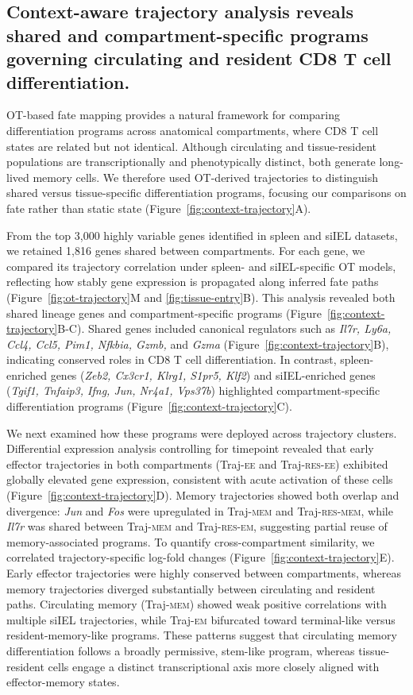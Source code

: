 \subsection{Context-aware trajectory analysis reveals shared and compartment-specific programs governing circulating and resident CD8 T cell differentiation. }

OT-based fate mapping provides a natural framework for comparing differentiation programs across anatomical compartments, where CD8 T cell states are related but not identical. Although circulating and tissue-resident populations are transcriptionally and phenotypically distinct, both generate long-lived memory cells. We therefore used OT-derived trajectories to distinguish shared versus tissue-specific differentiation programs, focusing our comparisons on fate rather than static state (Figure~\ref{fig:context-trajectory}A).

From the top 3,000 highly variable genes identified in spleen and siIEL datasets, we retained 1,816 genes shared between compartments. For each gene, we compared its trajectory correlation under spleen- and siIEL-specific OT models, reflecting how stably gene expression is propagated along inferred fate paths (Figure~\ref{fig:ot-trajectory}M and \ref{fig:tissue-entry}B). This analysis revealed both shared lineage genes and compartment-specific programs (Figure~\ref{fig:context-trajectory}B-C). Shared genes included canonical regulators such as \emph{Il7r, Ly6a, Ccl4, Ccl5, Pim1, Nfkbia, Gzmb,} and \emph{Gzma} (Figure~\ref{fig:context-trajectory}B), indicating conserved roles in CD8 T cell differentiation. In contrast, spleen-enriched genes (\emph{Zeb2, Cx3cr1, Klrg1, S1pr5, Klf2}) and siIEL-enriched genes (\emph{Tgif1, Tnfaip3, Ifng, Jun, Nr4a1, Vps37b}) highlighted compartment-specific differentiation programs (Figure~\ref{fig:context-trajectory}C).

We next examined how these programs were deployed across trajectory clusters. Differential expression analysis controlling for timepoint revealed that early effector trajectories in both compartments (Traj-\textsc{ee} and Traj-\textsc{res-ee}) exhibited globally elevated gene expression, consistent with acute activation of these cells (Figure~\ref{fig:context-trajectory}D). Memory trajectories showed both overlap and divergence: \emph{Jun} and \emph{Fos} were upregulated in Traj-\textsc{mem} and Traj-\textsc{res-mem}, while \emph{Il7r} was shared between Traj-\textsc{mem} and Traj-\textsc{res-em}, suggesting partial reuse of memory-associated programs. To quantify cross-compartment similarity, we correlated trajectory-specific log-fold changes (Figure~\ref{fig:context-trajectory}E). Early effector trajectories were highly conserved between compartments, whereas memory trajectories diverged substantially between circulating and resident paths. Circulating memory (Traj-\textsc{mem}) showed weak positive correlations with multiple siIEL trajectories, while Traj-\textsc{em} bifurcated toward terminal-like versus resident-memory-like programs. These patterns suggest that circulating memory differentiation follows a broadly permissive, stem-like program, whereas tissue-resident cells engage a distinct transcriptional axis more closely aligned with effector-memory states.

